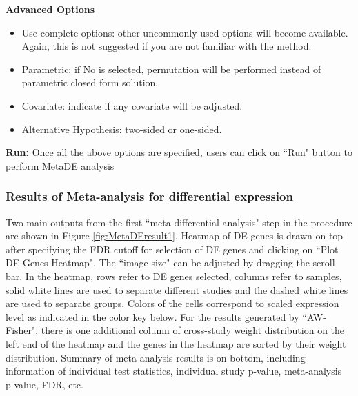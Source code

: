 \begin{steps}
\item \textbf{Advanced Options}
\begin{itemize}
\item Use complete options: other uncommonly used options will become available. Again, this is not suggested if you are not familiar with the method.
\item Parametric: if No is selected, permutation will be performed instead of parametric closed form solution.
\item Covariate: indicate if any covariate will be adjusted.
\item Alternative Hypothesis: two-sided or one-sided.
\end{itemize}

\item \textbf{Run:}
Once all the above options are specified, users can click on ``Run" button to perform MetaDE analysis

\end{steps}


\subsubsection{Results of Meta-analysis for differential expression}

Two main outputs from the first ``meta differential analysis" step in the procedure are shown in Figure \ref{fig:MetaDEresult1}. 
Heatmap of DE genes is drawn on top after specifying the FDR cutoff for selection of DE genes and clicking on ``Plot DE Genes Heatmap". 
The ``image size" can be adjusted by dragging the scroll bar. 
In the heatmap, rows refer to DE genes selected, columns refer to samples, solid white lines are used to separate different studies and the dashed white lines are used to separate groups. 
Colors of the cells correspond to scaled expression level as indicated in the color key below. 
For the results generated by ``AW-Fisher", there is one additional column of cross-study weight distribution on the left end of the heatmap and the genes in the heatmap are sorted by their weight distribution.
Summary of meta analysis results is on bottom, 
including information of individual test statistics, individual study p-value, meta-analysis p-value, FDR, etc. 


